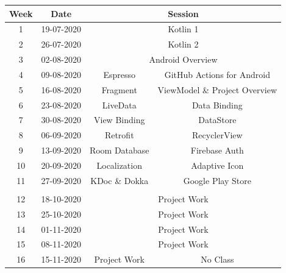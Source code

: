 \documentclass{article}
\begin{document}
\renewcommand{\arraystretch}{1.5}
\begin{tabular}{|c|c|c|c|}
	\hline
	\textbf{Week} & \textbf{Date}     & \multicolumn{2}{c|}{\textbf{Session}}        \\ \hline
	\small 1      & \small 19-07-2020 & \multicolumn{2}{c|}{\small Kotlin 1} \\ \hline
	\small 2      & \small 26-07-2020 & \multicolumn{2}{c|}{\small Kotlin 2} \\ \hline
	\small 3      & \small 02-08-2020 & \multicolumn{2}{c|}{\small Android Overview} \\ \hline
	\small 4      & \small 09-08-2020 & \small Espresso & \small GitHub Actions for Android  \\ \hline
	\small 5      & \small 16-08-2020 & \small Fragment & \small ViewModel \& Project Overview  \\ \hline
	\small 6      & \small 23-08-2020 & \small LiveData & \small Data Binding  \\ \hline
	\small 7      & \small 30-08-2020 & \small View Binding & \small DataStore  \\ \hline
	\small 8      & \small 06-09-2020 & \small Retrofit & \small RecyclerView  \\ \hline
	\small 9      & \small 13-09-2020 & \small Room Database  & \small Firebase Auth  \\ \hline

	\small 10     & \small 20-09-2020 & \small Localization & \small Adaptive Icon   \\ \hline 
	\small 11     & \small 27-09-2020 & \small KDoc \& Dokka & \small Google Play Store  \\ \hline
	\rowcolor{yellow} \multicolumn{4}{|c|}{\small Mid Term Break}                    \\ \hline
	\small 12     & \small 18-10-2020 & \multicolumn{2}{c|}{\small Project Work}     \\ \hline
	\small 13     & \small 25-10-2020 & \multicolumn{2}{c|}{\small Project Work}     \\ \hline
	\small 14     & \small 01-11-2020 & \multicolumn{2}{c|}{\small Project Work}     \\ \hline
	\small 15     & \small 08-11-2020 & \multicolumn{2}{c|}{\small Project Work}     \\ \hline
	\small 16     & \small 15-11-2020 & \small Project Work & \small No Class  \\ \hline
\end{tabular}
\end{document}
